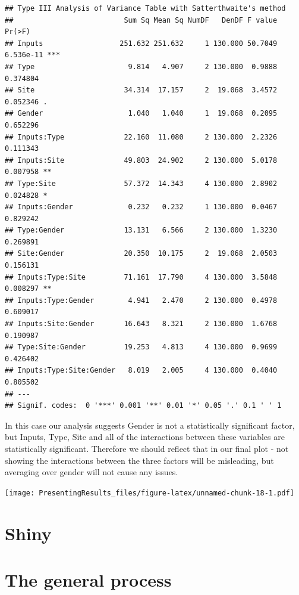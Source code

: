 \documentclass[
]{book}
\begin{document}
\begin{verbatim}
## Type III Analysis of Variance Table with Satterthwaite's method
##                          Sum Sq Mean Sq NumDF   DenDF F value    Pr(>F)    
## Inputs                  251.632 251.632     1 130.000 50.7049 6.536e-11 ***
## Type                      9.814   4.907     2 130.000  0.9888  0.374804    
## Site                     34.314  17.157     2  19.068  3.4572  0.052346 .  
## Gender                    1.040   1.040     1  19.068  0.2095  0.652296    
## Inputs:Type              22.160  11.080     2 130.000  2.2326  0.111343    
## Inputs:Site              49.803  24.902     2 130.000  5.0178  0.007958 ** 
## Type:Site                57.372  14.343     4 130.000  2.8902  0.024828 *  
## Inputs:Gender             0.232   0.232     1 130.000  0.0467  0.829242    
## Type:Gender              13.131   6.566     2 130.000  1.3230  0.269891    
## Site:Gender              20.350  10.175     2  19.068  2.0503  0.156131    
## Inputs:Type:Site         71.161  17.790     4 130.000  3.5848  0.008297 ** 
## Inputs:Type:Gender        4.941   2.470     2 130.000  0.4978  0.609017    
## Inputs:Site:Gender       16.643   8.321     2 130.000  1.6768  0.190987    
## Type:Site:Gender         19.253   4.813     4 130.000  0.9699  0.426402    
## Inputs:Type:Site:Gender   8.019   2.005     4 130.000  0.4040  0.805502    
## ---
## Signif. codes:  0 '***' 0.001 '**' 0.01 '*' 0.05 '.' 0.1 ' ' 1
\end{verbatim}

In this case our analysis suggests Gender is not a statistically significant factor, but Inputs, Type, Site and all of the interactions between these variables are statistically significant. Therefore we should reflect that in our final plot - not showing the interactions between the three factors will be misleading, but averaging over gender will not cause any issues.

\texttt{[image: PresentingResults\_files/figure-latex/unnamed-chunk-18-1.pdf]}

\hypertarget{shiny}{%
\section{Shiny}\label{shiny}}

\hypertarget{the-general-process}{%
\section{The general process}\label{the-general-process}}
\end{document}
